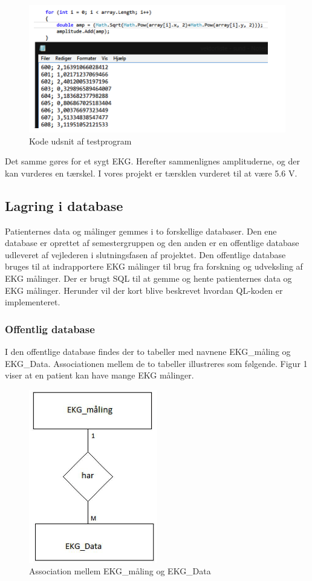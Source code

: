 \begin{figure}[H]
	\centering
	\includegraphics[width=1\textwidth]{Figurer/Snip20150520_13}
	\caption{Kode udsnit af testprogram}
\end{figure}

Det samme gøres for et sygt EKG. Herefter sammenlignes amplituderne, og der kan vurderes en tærskel. I vores projekt er tærsklen vurderet til at være 5.6 V. 

\subsection{Lagring i database}
Patienternes data og målinger gemmes i to forskellige databaser. Den ene database er oprettet af semestergruppen og den anden er en offentlige database udleveret af vejlederen i slutningsfasen af projektet. Den offentlige database bruges til at indrapportere EKG målinger til brug fra forskning og udveksling af EKG målinger.  Der er brugt SQL til at gemme og hente patienternes data og EKG målinger. Herunder vil der kort blive beskrevet hvordan QL-koden er implementeret. 

\subsubsection{Offentlig database}
I den offentlige database findes der to tabeller med navnene EKG\_måling og EKG\_Data. Associationen mellem de to tabeller illustreres som følgende. Figur 1 viser at en patient kan have mange EKG målinger. 

\begin{figure}[H]
	\centering
	\includegraphics[width=0.5\textwidth]{Figurer/Snip20150525_38}
	\caption{Association mellem EKG\_måling og EKG\_Data}
\end{figure}

